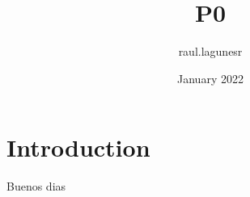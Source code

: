 \documentclass{article}
\title{P0}
\author{raul.lagunesr }
\date{January 2022}
\begin{document}
\maketitle

\section{Introduction}

Buenos dias 
\end{document}
